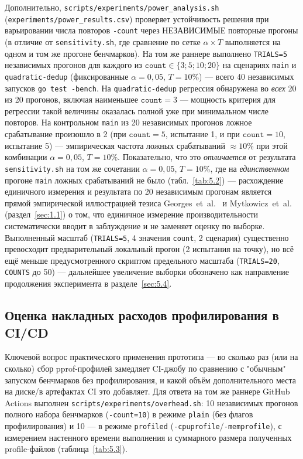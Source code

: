 Дополнительно, \texttt{scripts/\allowbreak experiments/\allowbreak power\_analysis.sh}
(\texttt{experiments/\allowbreak power\_results.csv}) проверяет устойчивость решения
при варьировании числа повторов \texttt{-count} через НЕЗАВИСИМЫЕ повторные
прогоны (в отличие от \texttt{sensitivity.sh}, где сравнение по сетке
$\alpha \times T$ выполняется на одном и том же прогоне бенчмарков). На том же
раннере выполнено \texttt{TRIALS=5} независимых прогонов для каждого из
$\texttt{count} \in \{3;5;10;20\}$ на сценариях \texttt{main} и
\texttt{quadratic-dedup} (фиксированные $\alpha=0{,}05$, $T=10\%$) — всего 40
независимых запусков \texttt{go test -bench}. На \texttt{quadratic-dedup}
регрессия обнаружена во \emph{всех} 20 из 20 прогонов, включая наименьшее
$\texttt{count}=3$ — мощность критерия для регрессии такой величины
оказалась полной уже при минимальном числе повторов. На контрольном
\texttt{main} из 20 независимых прогонов ложное срабатывание произошло в 2
(при $\texttt{count}=5$, испытание 1, и при $\texttt{count}=10$, испытание
5) — эмпирическая частота ложных срабатываний $\approx 10\%$ при этой
комбинации $\alpha=0{,}05$, $T=10\%$. Показательно, что это \emph{отличается}
от результата \texttt{sensitivity.sh} на том же сочетании $\alpha=0{,}05$,
$T=10\%$, где на \emph{единственном} прогоне \texttt{main} ложных
срабатываний не было (табл.~\ref{tab:5.2}) — расхождение единичного
измерения и результата по 20 независимым прогонам является прямой
эмпирической иллюстрацией тезиса Georges~et~al.~\cite{georges2007} и
Mytkowicz~et~al.~\cite{mytkowicz2009} (раздел~\ref{sec:1.1}) о том, что
единичное измерение производительности систематически вводит в
заблуждение и не заменяет оценку по выборке. Выполненный масштаб
(\texttt{TRIALS=5}, 4 значения \texttt{count}, 2 сценария) существенно
превосходит предварительный локальный прогон (2 испытания на точку), но
всё ещё меньше предусмотренного скриптом предельного масштаба
(\texttt{TRIALS=20}, \texttt{COUNTS} до 50) — дальнейшее увеличение
выборки обозначено как направление продолжения эксперимента в
разделе~\ref{sec:5.4}.

\subsection{Оценка накладных расходов профилирования в CI/CD}
\label{sec:5.3}

Ключевой вопрос практического применения прототипа — во сколько раз (или
на сколько) сбор pprof-профилей замедляет CI-джобу по сравнению с
"обычным" запуском бенчмарков без профилирования, и какой объём
дополнительного места на диске/в артефактах CI это добавляет. Для ответа
на том же раннере GitHub Actions выполнен
\texttt{scripts/\allowbreak experiments/\allowbreak overhead.sh}: 10 независимых прогонов
полного набора бенчмарков (\texttt{-count=10}) в режиме \texttt{plain} (без
флагов профилирования) и 10 — в режиме \texttt{profiled}
(\texttt{-cpuprofile}/\texttt{-memprofile}), с измерением настенного
времени выполнения и суммарного размера полученных profile-файлов
(таблица~\ref{tab:5.3}).

